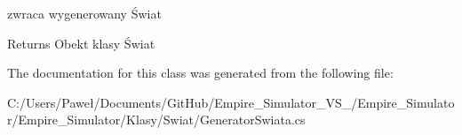 zwraca wygenerowany Świat 

\begin{DoxyReturn}{Returns}
Obekt klasy Świat
\end{DoxyReturn}


The documentation for this class was generated from the following file\+:\begin{DoxyCompactItemize}
\item 
C\+:/\+Users/\+Paweł/\+Documents/\+Git\+Hub/\+Empire\+\_\+\+Simulator\+\_\+\+V\+S\+\_/\+Empire\+\_\+\+Simulator/\+Empire\+\_\+\+Simulator/\+Klasy/\+Swiat/Generator\+Swiata.\+cs\end{DoxyCompactItemize}
